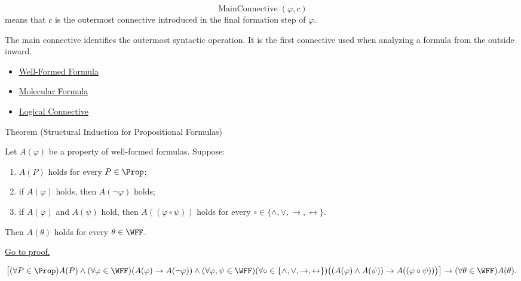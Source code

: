 \begin{remark*}
\[
  \operatorname{MainConnective}(\varphi,c)
\] means that \(c\) is the outermost connective introduced in the final formation step of \(\varphi\).
\end{remark*}

\begin{remark*}[Interpretation]
The main connective identifies the outermost syntactic operation. It is the first connective used when analyzing a formula from the outside inward.
\end{remark*}

\begin{dependencies}
\begin{itemize}
  \item \hyperref[def:well-formed-formula]{Well-Formed Formula}
  \item \hyperref[def:molecular-formula-propositional-logic]{Molecular Formula}
  \item \hyperref[def:logical-connective]{Logical Connective}
\end{itemize}
\end{dependencies}
\begin{theorembox}{Theorem (Structural Induction for Propositional Formulas)}
\begin{theorem}
\label{thm:structural-induction-propositional-formulas}
Let \(A(\varphi)\) be a property of well-formed formulas. Suppose:
\begin{enumerate}
\item \(A(P)\) holds for every \(P\in\Prop\);
\item if \(A(\varphi)\) holds, then \(A(\neg\varphi)\) holds;
\item if \(A(\varphi)\) and \(A(\psi)\) hold, then \(A((\varphi\circ\psi))\) holds for every \(\circ\in\{\land,\lor,\to,\leftrightarrow\}\).
\end{enumerate}
Then \(A(\theta)\) holds for every \(\theta\in\WFF\).

\noindent\hyperref[prf:structural-induction-propositional-formulas]{Go to proof.}
\end{theorem}
\end{theorembox}
\begin{remark*}
\[
\left[
(\forall P\in\Prop)A(P)
\land
(\forall\varphi\in\WFF)(A(\varphi)\to A(\neg\varphi))
\land
(\forall\varphi,\psi\in\WFF)
(\forall\circ\in\{\land,\lor,\to,\leftrightarrow\})
\bigl((A(\varphi)\land A(\psi))\to A((\varphi\circ\psi))\bigr)
\right]
\to
(\forall\theta\in\WFF)A(\theta).
\]
\end{remark*}




